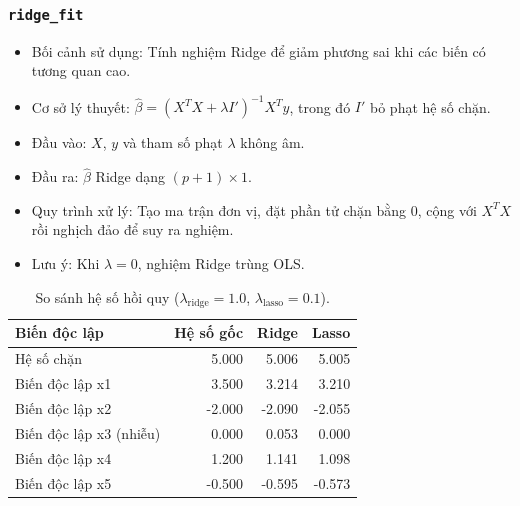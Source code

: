 \documentclass[a4paper]{article}
\newcommand{\code}[1]{\colorbox{light-gray}{\texttt{#1}}}
\begin{document}
\subsubsection{\texorpdfstring{\code{ridge\_fit}}{ridge\_fit}}
\begin{itemize}[leftmargin=*]
    \item Bối cảnh sử dụng: Tính nghiệm Ridge để giảm phương sai khi các biến có tương quan cao.
    \item Cơ sở lý thuyết: $\hat{\beta}=(X^T X+\lambda I')^{-1}X^T y$, trong đó $I'$ bỏ phạt hệ số chặn.
    \item Đầu vào: $X$, $y$ và tham số phạt $\lambda$ không âm.
    \item Đầu ra: $\hat{\beta}$ Ridge dạng $(p+1)\times1$.
    \item Quy trình xử lý: Tạo ma trận đơn vị, đặt phần tử chặn bằng 0, cộng với $X^T X$ rồi nghịch đảo để suy ra nghiệm.
    \item Lưu ý: Khi $\lambda=0$, nghiệm Ridge trùng OLS.
\end{itemize}
\begin{table}[H]
    \centering
    \small
    \begin{tabular}{lrrr}
    \toprule
    \textbf{Biến độc lập} & \textbf{Hệ số gốc} & \textbf{Ridge} & \textbf{Lasso} \\
    \midrule
    Hệ số chặn & 5.000 & 5.006 & 5.005 \\
    Biến độc lập x1 & 3.500 & 3.214 & 3.210 \\
    Biến độc lập x2 & -2.000 & -2.090 & -2.055 \\
    Biến độc lập x3 (nhiễu) & 0.000 & 0.053 & 0.000 \\
    Biến độc lập x4 & 1.200 & 1.141 & 1.098 \\
    Biến độc lập x5 & -0.500 & -0.595 & -0.573 \\
    \bottomrule
    \end{tabular}
    \caption{So sánh hệ số hồi quy ($\lambda_{\text{ridge}}=1.0$, $\lambda_{\text{lasso}}=0.1$).}
\end{table}
\end{document}
